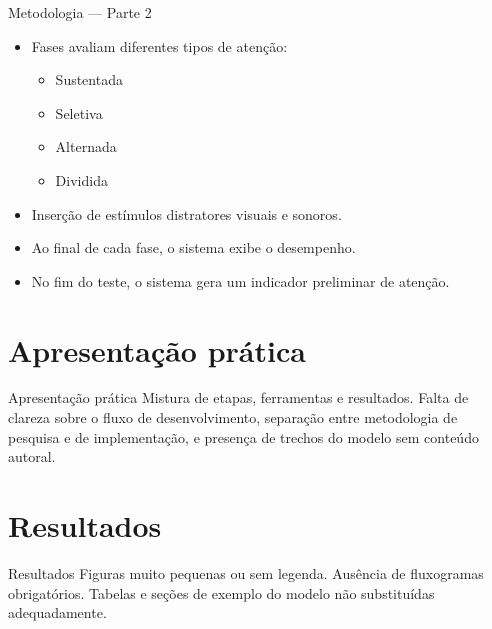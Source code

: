 \documentclass{beamer}
\begin{document}
\begin{frame}{Metodologia — Parte 2}
\justifying

\begin{itemize}
    \item Fases avaliam diferentes tipos de atenção:
    \begin{itemize}
        \item Sustentada
        \item Seletiva
        \item Alternada
        \item Dividida
    \end{itemize}
    \item Inserção de estímulos distratores visuais e sonoros.
    \item Ao final de cada fase, o sistema exibe o desempenho.
    \item No fim do teste, o sistema gera um indicador preliminar de atenção.
\end{itemize}

\end{frame}

\section{Apresentação prática}
\begin{frame}{Apresentação prática}
\justifying
Mistura de etapas, ferramentas e resultados.  
Falta de clareza sobre o fluxo de desenvolvimento, separação entre metodologia de pesquisa e de implementação, e presença de trechos do modelo sem conteúdo autoral.
\end{frame}

\section{Resultados}
\begin{frame}{Resultados}
\justifying
Figuras muito pequenas ou sem legenda.  
Ausência de fluxogramas obrigatórios.  
Tabelas e seções de exemplo do modelo não substituídas adequadamente.
\end{frame}
\end{document}
